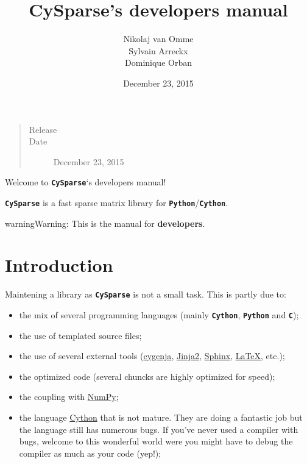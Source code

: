 \documentclass[letterpaper,10pt,english]{sphinxmanual}
\title{CySparse's developers manual}
\date{December 23, 2015}
\author{Nikolaj van Omme\\Sylvain Arreckx\\Dominique Orban}
\begin{document}
\maketitle
\tableofcontents
{}\label{contents::doc}

\begin{quote}\begin{description}
\item[{Release}] 

\item[{Date}] \leavevmode
December 23, 2015

\end{description}\end{quote}

Welcome to \textbf{\texttt{CySparse}}`s developers manual!

\textbf{\texttt{CySparse}} is a fast sparse matrix library for \textbf{\texttt{Python}}/\textbf{\texttt{Cython}}.

\begin{notice}{warning}{Warning:}
This is the manual for \textbf{developers}.
\end{notice}


\chapter{Introduction}
\label{introduction:introduction}\label{introduction::doc}\label{introduction:cysparse-s-developers-manual}
Maintening a library as \textbf{\texttt{CySparse}} is not a small task. This is partly due to:
\begin{itemize}
\item {} 
the mix of several programming languages (mainly \textbf{\texttt{Cython}}, \textbf{\texttt{Python}} and \textbf{\texttt{C}});

\item {} 
the use of templated source files;

\item {} 
the use of several external tools (\href{https://github.com/PythonOptimizers/cygenja}{cygenja}, \href{http://jinja.pocoo.org/}{Jinja2}, \href{http://sphinx-doc.org/}{Sphinx}, \href{https://www.latex-project.org/}{LaTeX}, etc.);

\item {} 
the optimized code (several chuncks are highly optimized for speed);

\item {} 
the coupling with \href{http://www.numpy.org/}{NumPy};

\item {} 
the language \href{http://cython.org/}{Cython} that is not mature. They are doing a fantastic job but the language still has numerous bugs. If you've never used a compiler with bugs, welcome to this wonderful world were you might have
to debug the compiler as much as your code (yep!);

\end{itemize}
\end{document}
